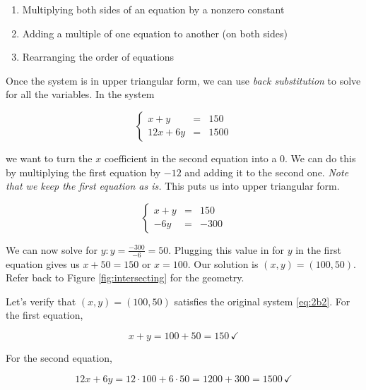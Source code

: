 \documentclass[
]{book}
\providecommand{\tightlist}{%
  \setlength{\itemsep}{0pt}\setlength{\parskip}{0pt}}
\theoremstyle{definition}
\theoremstyle{definition}
\theoremstyle{definition}
\theoremstyle{definition}
\theoremstyle{remark}
\begin{document}
\begin{enumerate}
\def\labelenumi{\arabic{enumi}.}
\tightlist
\item
  Multiplying both sides of an equation by a nonzero constant
\item
  Adding a multiple of one equation to another (on both sides)
\item
  Rearranging the order of equations
\end{enumerate}

Once the system is in upper triangular form, we can use \emph{back substitution} to solve for all the variables. In the system

\begin{equation*}
\left\{ 
\begin{array}{ccl}
x+y&=&150\\
    12x+6y&=&1500
\end{array}\right. 
\end{equation*}

we want to turn the \(x\) coefficient in the second equation into a \(0\). We can do this by multiplying the first equation by \(-12\) and adding it to the second one. \emph{Note that we keep the first equation as is.} This puts us into upper triangular form.

\begin{equation*}
\left\{ 
\begin{array}{ccl}
x+y&=&150\\
    -6y&=&-300
\end{array}\right. \label{eq:utf}
\end{equation*}

We can now solve for \(y: y=\frac{-300}{-6}=50\). Plugging this value in for \(y\) in the first equation gives us \(x+50=150\) or \(x=100\). Our solution is \((x,y)=(100,50).\) Refer back to Figure \ref{fig:intersecting} for the geometry.

Let's verify that \((x,y)=(100,50)\) satisfies the original system \eqref{eq:2b2}. For the first equation,

\[x+y=100+50=150\,\checkmark\]

For the second equation,

\[12x+6y=12\cdot 100+6\cdot 50=1200+300=1500\,\checkmark\]
\end{document}
